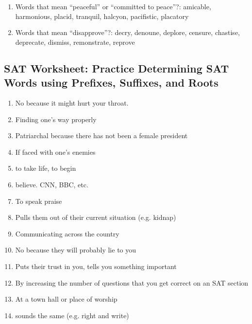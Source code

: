 \begin{enumerate}
\begin{enumerate}
\item Words that mean ``peaceful'' or ``committed to peace''?: amicable, harmonious, placid, tranquil, halcyon, pacifistic, placatory

\item Words that mean ``disapprove''?: decry, denoune, deplore, censure, chastise, deprecate, dismiss, remonstrate, reprove

\end{enumerate}

\subsection{SAT Worksheet: Practice Determining SAT Words using Prefixes, Suffixes, and Roots}

\begin{enumerate}

\item No because it might hurt your throat.

\item Finding one's way properly

\item Patriarchal because there has not been a female president

\item If faced with one's enemies

\item to take life, to begin

\item believe. CNN, BBC, etc.

\item To speak praise

\item Pulls them out of their current situation (e.g. kidnap)

\item Communicating across the country

\item No because they will probably lie to you

\item Puts their trust in you, tells you something important

\item By increasing the number of questions that you get correct on an SAT section

\item At a town hall or place of worship

\item sounds the same (e.g. right and write)


\end{enumerate}
\end{enumerate}
